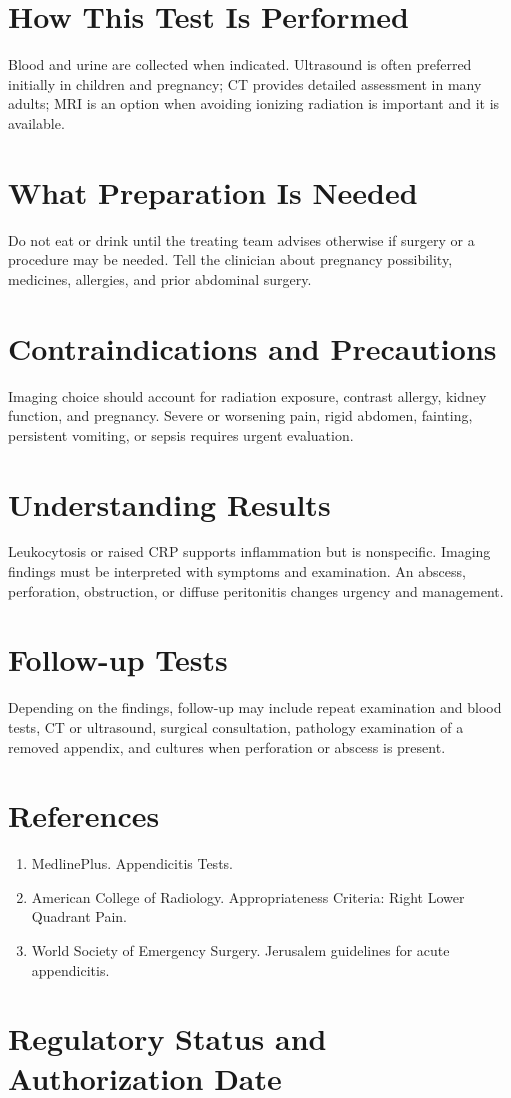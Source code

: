 \section*{How This Test Is Performed}
Blood and urine are collected when indicated. Ultrasound is often preferred initially in children and pregnancy; CT provides detailed assessment in many adults; MRI is an option when avoiding ionizing radiation is important and it is available.

\section*{What Preparation Is Needed}
Do not eat or drink until the treating team advises otherwise if surgery or a procedure may be needed. Tell the clinician about pregnancy possibility, medicines, allergies, and prior abdominal surgery.

\section*{Contraindications and Precautions}
Imaging choice should account for radiation exposure, contrast allergy, kidney function, and pregnancy. Severe or worsening pain, rigid abdomen, fainting, persistent vomiting, or sepsis requires urgent evaluation.

\section*{Understanding Results}
Leukocytosis or raised CRP supports inflammation but is nonspecific. Imaging findings must be interpreted with symptoms and examination. An abscess, perforation, obstruction, or diffuse peritonitis changes urgency and management.

\section*{Follow-up Tests}
Depending on the findings, follow-up may include repeat examination and blood tests, CT or ultrasound, surgical consultation, pathology examination of a removed appendix, and cultures when perforation or abscess is present.

\section*{References}
\begin{enumerate}
  \item MedlinePlus. Appendicitis Tests.
  \item American College of Radiology. Appropriateness Criteria: Right Lower Quadrant Pain.
  \item World Society of Emergency Surgery. Jerusalem guidelines for acute appendicitis.
\end{enumerate}

\clearpage


\section*{Regulatory Status and Authorization Date}

\clearpage
